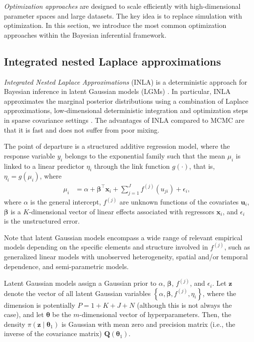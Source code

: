 \textit{Optimization approaches} are designed to scale efficiently with high-dimensional parameter spaces and large datasets. The key idea is to replace simulation with optimization. In this section, we introduce the most common optimization approaches within the Bayesian inferential framework. 

\subsection{Integrated nested Laplace approximations}\label{sec15_21}
\textit{Integrated Nested Laplace Approximations} (INLA) is a deterministic approach for Bayesian inference in latent Gaussian models (LGMs) \cite{rue2009approximate}. In particular, INLA approximates the marginal posterior distributions using a combination of Laplace approximations, low-dimensional deterministic integration and optimization steps in sparse covariance settings \cite{rue2017bayesian}. The advantages of INLA compared to MCMC are that it is fast and does not suffer from poor mixing.

The point of departure is a structured additive regression model, where the response variable $y_i$ belongs to the exponential family such that the mean $\mu_i$ is linked to a linear predictor $\eta_i$ through the link function $g(\cdot)$, that is, $\eta_i=g(\mu_i)$, where
\begin{align*}
	\mu_i&=\alpha+\boldsymbol{\beta}^{\top}\boldsymbol{x}_{i}+\sum_{j=1}^{J}f^{(j)}(u_{ji})+\epsilon_{i},
\end{align*}
where $\alpha$ is the general intercept, $f^{(j)}$ are unknown functions of the covariates $\boldsymbol{u}_i$, $\boldsymbol{\beta}$ is a $K$-dimensional vector of linear effects associated with regressors $\boldsymbol{x}_i$, and $\epsilon_{i}$ is the unstructured error.

Note that latent Gaussian models encompass a wide range of relevant empirical models depending on the specific elements and structure involved in $f^{(j)}$, such as generalized linear models with unobserved heterogeneity, spatial and/or temporal dependence, and semi-parametric models.

Latent Gaussian models assign a Gaussian prior to $\alpha$, $\boldsymbol{\beta}$, $f^{(j)}$, and $\epsilon_{i}$. Let $\boldsymbol{z}$ denote the vector of all latent Gaussian variables $\left\{\alpha, \boldsymbol{\beta}, f^{(j)},\eta_{i}\right\}$, where the dimension is potentially \( P = 1 + K + J + N \) (although this is not always the case), and let $\boldsymbol{\theta}$ be the $m$-dimensional vector of hyperparameters. Then, the density $\pi(\boldsymbol{z} \mid \boldsymbol{\theta}_1)$ is Gaussian with mean zero and precision matrix (i.e., the inverse of the covariance matrix) $\boldsymbol{Q}(\boldsymbol{\theta}_1)$.

